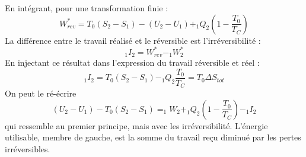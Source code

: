 		En intégrant, pour une transformation finie :
		\begin{equation}
		W_{rev}^* =T_0(S_2-S_1) - (U_2-U_1) + _1Q_2\left(1-\dfrac{T_0}{T_C}\right)
		\end{equation}
		La différence entre le travail réalisé et le réversible est l'irréversibilité :
		\begin{equation}
		_1I_2 = W_{rev}^* - _1W_2^*
		\end{equation}
		En injectant ce résultat dans l'expression du travail réversible et réel :
		\begin{equation}
		_1I_2 = T_0(S_2-S_1)-_1Q_2\dfrac{T_0}{T_C} = T_0\Delta S_{tot}
		\end{equation}
		On peut le ré-écrire 
		\begin{equation}
		(U_2-U_1) - T_0(S_2-S_1) = _1W_2 + _1Q_2\left(1-\dfrac{T_0}{T_C}\right)-_1I_2
		\end{equation}
		qui ressemble au premier principe, mais avec les irréversibilité. L'énergie 
		utilisable, membre de gauche, est la somme du travail reçu diminué par les 
		pertes irréversibles.
		
